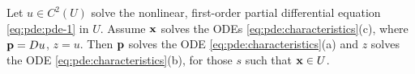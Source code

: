 \begin{theorem}
  Let \(u\in C^2(U)\) solve the nonlinear, first-order partial differential
  equation \eqref{eq:pde:pde-1} in \(U\). Assume \(\mathbf{x}\) solves the ODEs
  \eqref{eq:pde:characteristics}\textnormal{(c)}, where \(\mathbf{p}=Du\),
  \(z=u\). Then \(\mathbf{p}\) solves the ODE
  \eqref{eq:pde:characteristics}\textnormal{(a)} and \(z\) solves the ODE
  \eqref{eq:pde:characteristics}\textnormal{(b)}, for those \(s\) such that
  \(\mathbf{x}\in U\).
\end{theorem}

